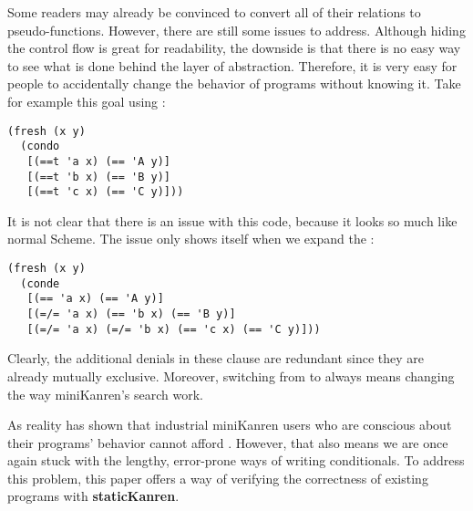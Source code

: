 Some readers may already be convinced to convert all of their relations to pseudo-functions. However, there are still some issues to address. Although hiding the control flow is great for readability, the downside is that there is no easy way to see what is done behind the layer of abstraction. Therefore, it is very easy for people to accidentally change the behavior of programs without knowing it. Take for example this  goal using :
\begin{lstlisting}
(fresh (x y)
  (condo
   [(==t 'a x) (== 'A y)]
   [(==t 'b x) (== 'B y)]
   [(==t 'c x) (== 'C y)]))
\end{lstlisting}
It is not clear that there is an issue with this code, because it looks so much like normal Scheme. The issue only shows itself when we expand the :
\begin{lstlisting}
(fresh (x y)
  (conde
   [(== 'a x) (== 'A y)]
   [(=/= 'a x) (== 'b x) (== 'B y)]
   [(=/= 'a x) (=/= 'b x) (== 'c x) (== 'C y)]))
\end{lstlisting}
Clearly, the additional denials in these  clause are redundant since they are already mutually exclusive. Moreover, switching from  to  always means changing the way miniKanren's search work.

As reality has shown that industrial miniKanren users who are conscious about their programs' behavior cannot afford . However, that also means we are once again stuck with the lengthy, error-prone ways of writing conditionals. To address this problem, this paper offers a way of verifying the correctness of existing programs with \textbf{staticKanren}.